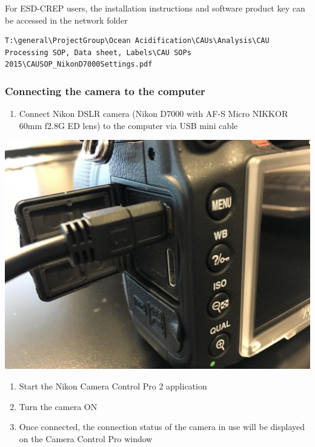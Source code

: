 \documentclass[]{book}
\providecommand{\tightlist}{%
  \setlength{\itemsep}{0pt}\setlength{\parskip}{0pt}}
\begin{document}
For ESD-CREP users, the installation instructions and software product key can be accessed in the network folder

\begin{verbatim}
T:\general\ProjectGroup\Ocean Acidification\CAUs\Analysis\CAU Processing SOP, Data sheet, Labels\CAU SOPs 2015\CAUSOP_NikonD7000Settings.pdf
\end{verbatim}

\hypertarget{connecting-the-camera-to-the-computer}{%
\subsubsection{Connecting the camera to the computer}\label{connecting-the-camera-to-the-computer}}

\begin{enumerate}
\def\labelenumi{\arabic{enumi}.}
\tightlist
\item
  Connect Nikon DSLR camera (Nikon D7000 with AF-S Micro NIKKOR 60mm f2.8G ED lens) to the computer via USB mini cable
\end{enumerate}

\includegraphics{images/Camera.jpg}

\begin{enumerate}
\def\labelenumi{\arabic{enumi}.}
\setcounter{enumi}{1}
\item
  Start the Nikon Camera Control Pro 2 application
\item
  Turn the camera ON
\item
  Once connected, the connection status of the camera in use will be displayed on the Camera Control Pro window
\end{enumerate}
\end{document}
